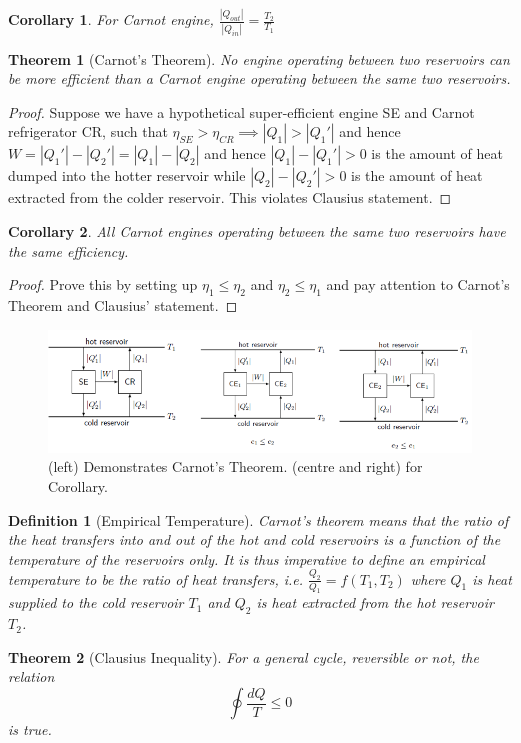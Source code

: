 \documentclass[a4paper]{article}
\newtheorem{defi}{Definition}[section]
\newtheorem{thm}{Theorem}[section]
\newtheorem{cor}{Corollary}[section]
\theoremstyle{new}
\begin{document}
\begin{cor}
For Carnot engine, $\frac{|Q_{out}|}{|Q_{in}|}=\frac{T_2}{T_1}$
\end{cor}
\begin{thm}[Carnot's Theorem]
No engine operating between two reservoirs can be more efficient than a Carnot engine operating between the same two reservoirs.
\end{thm}
\begin{proof}
Suppose we have a hypothetical super-efficient engine SE and Carnot refrigerator CR, such that $\eta_{SE}>\eta_{CR}\implies|Q_1|>|Q_1'|$ and hence $W=|Q_1'|-|Q_2'|=|Q_1|-|Q_2|$ and hence $|Q_1|-|Q_1'|>0$ is the amount of heat dumped into the hotter reservoir while $|Q_2|-|Q_2'|>0$ is the amount of heat extracted from the colder reservoir. This violates Clausius statement.
\end{proof}
\begin{cor}
All Carnot engines operating between the same two reservoirs have the same efficiency.
\end{cor}
\begin{proof}
Prove this by setting up $\eta_1\leq\eta_2$ and $\eta_2\leq\eta_1$ and pay attention to Carnot's Theorem and Clausius' statement.
\end{proof}
\begin{figure}[H]
    \centering
    \includegraphics[scale=0.7]{secondlaw3.PNG}
    \caption{(left) Demonstrates Carnot's Theorem. (centre and right) for Corollary. \cite{blundell2010concepts}}
\end{figure}
\begin{defi}[Empirical Temperature]
Carnot's theorem means that the ratio of the heat transfers into and out of the hot and cold reservoirs is a function of the temperature of the reservoirs only. It is thus imperative to define an empirical temperature to be the ratio of heat transfers, i.e. $\frac{Q_2}{Q_1}=f(T_1,T_2)$ where $Q_1$ is heat supplied to the cold reservoir $T_1$ and $Q_2$ is heat extracted from the hot reservoir $T_2$.
\end{defi}
\begin{thm}[Clausius Inequality]
For a general cycle, reversible or not, the relation $$\oint\frac{dQ}{T}\leq 0$$ is true.
\end{thm}
\end{document}
